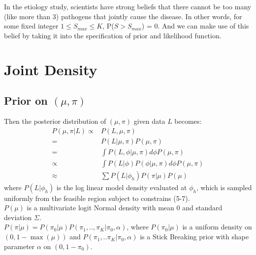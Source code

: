 \documentclass[11 pt, a4paper]{article}  %
\begin{document}
In the etiology study, scientists have strong beliefs that there cannot be too many (like more than 3) pathogens that jointly cause the disease. In other words, for some fixed integer $1\leq S_{max} \leq K$, P($S > S_{max}$) = 0. And we can make use of this belief by taking it into the specification of prior and likelihood function.
  

\section{Joint Density}
\subsection{Prior on $(\mu, \pi)$}


Then the posterior distribution of $(\mu, \pi)$ given data $L$ becomes:
\begin{align*}
P(\mu, \pi |L) \propto & P(L, \mu, \pi) \\
= & P(L | \mu, \pi) P(\mu, \pi) \\
= & \int P(L, \phi | \mu, \pi) d \phi P(\mu, \pi) \\
\propto & \int P(L | \phi) P(\phi | \mu,\pi) d \phi P(\mu, \pi) \\
\approx & \sum P(L | \phi_h) P(\pi | \mu) P(\mu)
\end{align*}
where $P(L | \phi_h)$ is the log linear model density evaluated at $\phi_h$, which is sampled uniformly from the feasible region subject to constrains (5-7).\\
$P(\mu)$ is a multivariate logit Normal density with mean $0$ and standard deviation $\Sigma$.\\
$P(\pi | \mu) = P(\pi_0 | \mu)P(\pi_1,.., \pi_K |\pi_0, \alpha)$, where $P(\pi_0 | \mu)$ is a uniform density on $(0, 1-\max(\mu))$ and $P(\pi_1,..\pi_K |\pi_0, \alpha)$ is a Stick Breaking prior with shape parameter $\alpha$ on $(0, 1-\pi_0)$.


\end{document}
